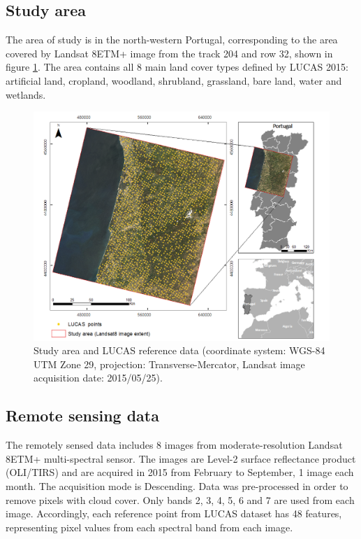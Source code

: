 \documentclass[remotesensing,article,submit,moreauthors,pdftex]{Definitions/mdpi}
\begin{document}
\subsection{Study area}

The area of study is in the north-western Portugal, corresponding to the area
covered by Landsat 8ETM+ image from the track 204 and row 32, shown in figure
\ref{fig:studyarea}. The area contains all 8 main land cover types defined by
LUCAS 2015: artificial land, cropland, woodland, shrubland, grassland, bare
land, water and wetlands.

\begin{figure}[H]
	\centering
	\includegraphics[width=1\linewidth]{../analysis/study_area}
	\caption{Study area and LUCAS reference data (coordinate system:
			WGS-84 UTM Zone 29, projection: Transverse-Mercator, Landsat image 
			acquisition date: 2015/05/25).}
	\label{fig:studyarea}
\end{figure}

\subsection{Remote sensing data}

The remotely sensed data includes 8 images from moderate-resolution Landsat
8ETM+ multi-spectral sensor. The images are Level-2 surface reflectance product 
(OLI/TIRS) and are acquired in 2015 from February to September, 1 image each 
month. The acquisition mode is Descending.  Data was pre-processed in order to 
remove pixels with cloud cover. Only bands 2, 3, 4, 5, 6 and 7 are used from 
each image. Accordingly, each reference point from LUCAS dataset has 48 
features, representing pixel values from each spectral band from each image.
\end{document}

